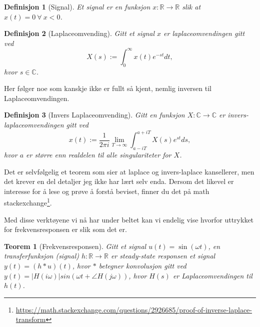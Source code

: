 \documentclass{article}
\newtheorem{theorem}{Teorem}
\newtheorem{definition}{Definisjon}
\begin{document}
\begin{definition}[Signal]
    Et signal er en funksjon $x:\mathbb{R} \longrightarrow \mathbb{R}$ slik at $x(t) = 0 \ \forall \ x < 0$.
\end{definition}

\begin{definition}[Laplaceomvending]
    Gitt et signal $x$ er laplaceomvendingen gitt ved \[
        X(s) := \int_0^\infty x(t) e^{-st}dt,
    \]
    hvor $s\in\mathbb{C}$. 
\end{definition}

Her følger noe som kanskje ikke er fullt så kjent, nemlig inversen til Laplaceomvendingen.

\begin{definition}[Invers Laplaceomvending]
\label{laplaceinverse}
    Gitt en funksjon $X:\mathbb{C} \longrightarrow \mathbb{C}$ er invers-laplaceomvendingen gitt ved \[
        x(t) := \frac{1}{2 \pi i} \lim_{T\to\infty} \int_{a - iT}^{a + iT} X(s) e^{st}ds,
    \]
    hvor $a$ er større enn realdelen til alle singulariteter for $X$.
\end{definition}

Det er selvfølgelig et teorem som sier at laplace og invers-laplace kansellerer, men det krever en del detaljer jeg ikke har lært selv enda. Dersom det likevel er interesse for å lese og prøve å forstå beviset, finner du det på math stackexchange\footnote{\url{https://math.stackexchange.com/questions/2926685/proof-of-inverse-laplace-transform}}.

Med disse verktøyene vi nå har under beltet kan vi endelig vise hvorfor uttrykket for frekvensresponsen er slik som det er.

\begin{theorem}[Frekvensresponsen]
    Gitt et signal $u(t) = \sin(\omega t)$, en transferfunksjon (signal) $h:\mathbb{R} \longrightarrow \mathbb{R}$ er steady-state responsen et signal $y(t) = (h * u)(t)$, hvor $*$ betegner konvolusjon gitt ved $y(t) = |H(i\omega)|sin(\omega t + \angle H(j\omega))$, hvor $H(s)$ er Laplaceomvendingen til $h(t)$.
\end{theorem}
\end{document}

